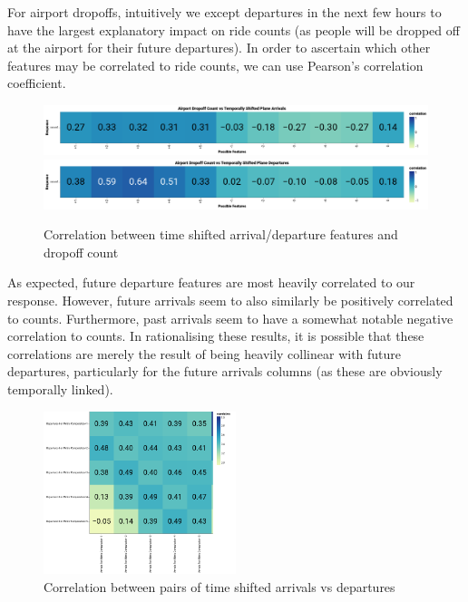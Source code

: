 \documentclass[11pt]{article}
\begin{document}
For airport dropoffs, intuitively we except departures in the next few hours to have the largest explanatory impact on ride counts (as people will be dropped off at the airport for their future departures). In order to ascertain which other features may be correlated to ride counts, we can use Pearson's correlation coefficient.

\begin{figure}[H]
    \centering
    \caption{Correlation between time shifted arrival/departure features and dropoff count}
\includegraphics[width=1\textwidth]{plots/dropoff_arrival_corr.png}
\includegraphics[width=1\textwidth]{plots/dropoff_departure_corr.png}
\end{figure}

As expected, future departure features are most heavily correlated to our response. However, future arrivals seem to also similarly be positively correlated to counts. Furthermore, past arrivals seem to have a somewhat notable negative correlation to counts. In rationalising these results, it is possible that these correlations are merely the result of being heavily collinear with future departures, particularly for the future arrivals columns (as these are obviously temporally linked).

\begin{figure}[h!]
    \centering
    \caption{Correlation between pairs of time shifted arrivals vs departures}
    \label{fig:corr_pairs}
    \includegraphics[width=0.5\textwidth]{plots/arrival_departure_time_correlation.png}
\end{figure}
\end{document}
